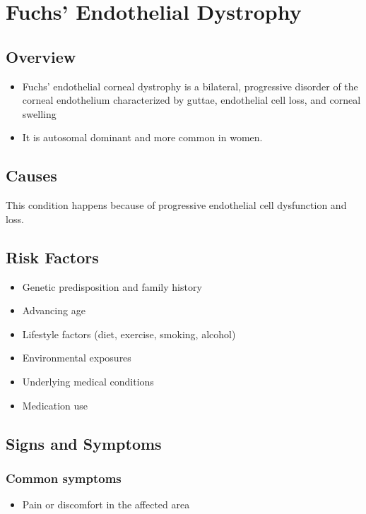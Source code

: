 \chapter{Fuchs' Endothelial Dystrophy}
\label{sec:Fuchs' Endothelial Dystrophy}

\section{Overview}


\begin{itemize}[noitemsep]
  \item Fuchs' endothelial corneal dystrophy is a bilateral, progressive disorder of the corneal endothelium characterized by guttae, endothelial cell loss, and corneal swelling
  \item It is autosomal dominant and more common in women.
\end{itemize}
\section{Causes}
This condition happens because of progressive endothelial cell dysfunction and loss.     
\section{Risk Factors}

\begin{itemize}[noitemsep]
  \item Genetic predisposition and family history
  \item Advancing age
  \item Lifestyle factors (diet, exercise, smoking, alcohol)
  \item Environmental exposures
  \item Underlying medical conditions
  \item Medication use
\end{itemize}
\section{Signs and Symptoms}

\subsection{Common symptoms}
\begin{itemize}[noitemsep]
  \item Pain or discomfort in the affected area
  \end{itemize}

